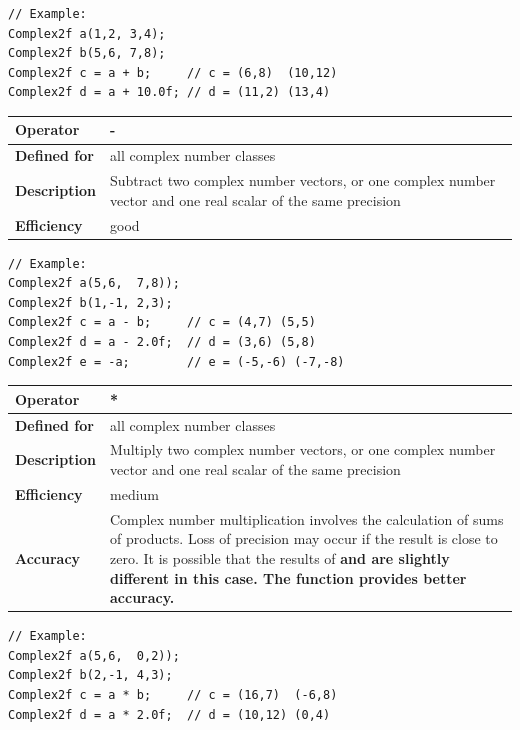 \documentclass[11pt,a4paper,oneside,openright]{report}
\newcommand{\vspacesmall}{\vspace{3mm}}
\newcommand{\vspacebig}{\vspace{6mm}}
\newcommand{\codei}[1]{\bfseries \ttfamily{#1}\normalfont}
\begin{document}
\begin{lstlisting}[frame=none]
// Example:
Complex2f a(1,2, 3,4);
Complex2f b(5,6, 7,8);
Complex2f c = a + b;     // c = (6,8)  (10,12)
Complex2f d = a + 10.0f; // d = (11,2) (13,4)
\end{lstlisting}
\vspacebig


\begin{tabular}{|p{25mm}|p{100mm}|}
\hline
\bfseries Operator & - \\ \hline
\bfseries Defined for & all complex number classes  \\ \hline
\bfseries Description & Subtract two complex number vectors, or one complex number vector and one real scalar of the same precision \\ \hline
\bfseries Efficiency & good \\ \hline
\end{tabular}
\vspacesmall

\begin{lstlisting}[frame=none]
// Example:
Complex2f a(5,6,  7,8));
Complex2f b(1,-1, 2,3);
Complex2f c = a - b;     // c = (4,7) (5,5)
Complex2f d = a - 2.0f;  // d = (3,6) (5,8)
Complex2f e = -a;        // e = (-5,-6) (-7,-8)
\end{lstlisting}
\vspacebig


\begin{tabular}{|p{25mm}|p{100mm}|}
\hline
\bfseries Operator & * \\ \hline
\bfseries Defined for & all complex number classes  \\ \hline
\bfseries Description & Multiply two complex number vectors, or one complex number vector and one real scalar of the same precision \\ \hline
\bfseries Efficiency & medium \\ \hline
\bfseries Accuracy & Complex number multiplication involves the calculation of sums of products. Loss of precision may occur if the result is close to zero. It is possible that the results of \codei{a * b} and \codei{b * a} are slightly different in this case. The function \codei{mul\_accurate} provides better accuracy.\\ \hline
\end{tabular}
\vspacesmall

\begin{lstlisting}[frame=none]
// Example:
Complex2f a(5,6,  0,2));
Complex2f b(2,-1, 4,3);
Complex2f c = a * b;     // c = (16,7)  (-6,8)
Complex2f d = a * 2.0f;  // d = (10,12) (0,4)
\end{lstlisting}
\vspacebig
\end{document}
